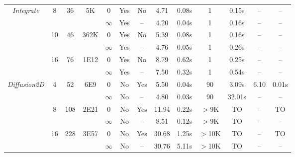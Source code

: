 \begin{savenotes}
\begin{table*}[t]
\begin{center}
\begin{threeparttable}
\begin{tabular}{|c|c|c|c|c|c|c||c|c||c|c||c|c|}
	   \multirow{6}{*}{\textit{Integrate}} & \multirow{2}{*}{8} & \multirow{2}{*}{36} &  \multirow{2}{*}{5K} 
          												     & 0 & Yes & No & 4.71 & 0.08s & 1 & 0.15s & --  & -- \tnote{a}\\ \cline{5-13}
          						       &                            & &  &  $\infty$ & Yes & -- & 4.20 & 0.04s & 1 & 0.16s &  -- & --\\ \cline{2-13}
						       		& \multirow{2}{*}{10} & \multirow{2}{*}{46} &  \multirow{2}{*}{362K} 
          												     & 0 & Yes & No & 5.39 & 0.08s & 1 & 0.16s & -- & -- \tnote{a}\\ \cline{5-13}
          						       &                            & &  &  $\infty$ & Yes & -- & 4.76 & 0.05s & 1 & 0.26s &  -- & --\\ \cline{2-13}
						              & \multirow{2}{*}{16} & \multirow{2}{*}{76} &  \multirow{2}{*}{1E12} 
          												     & 0 & Yes & No & 8.79 & 0.62s & 1 & 0.25s & -- & -- \tnote{a}\\ \cline{5-13}
          						       &                            & &  &  $\infty$ & Yes & -- & 7.50 & 0.32s & 1 & 0.54s & --  & --\\ \hline
						       \hline
						       
	    \multirow{6}{*}{\textit{Diffusion2D}} & \multirow{2}{*}{4} & \multirow{2}{*}{52} &  \multirow{2}{*}{6E9} 
          												     & 0 & No & Yes & 5.50 & 0.04s & 90 & 3.09s & 6.10 & 0.01s\\ \cline{5-13}
          						       &                            & &  &  $\infty$ & No & -- & 4.80 & 0.03s & 90 & 32.01s &  -- & --\\ \cline{2-13}
						       		& \multirow{2}{*}{8} & \multirow{2}{*}{108} &  \multirow{2}{*}{2E21} 
          												     & 0 & No & Yes & 11.94 & 0.22s & $>$9K & TO & -- & TO\\ \cline{5-13}
          						       &                            & &  &  $\infty$ & No & -- & 8.51 & 0.12s & $>$9K & TO &  -- & --\\ \cline{2-13}
						              & \multirow{2}{*}{16} & \multirow{2}{*}{228} &  \multirow{2}{*}{3E57} 
          												     & 0 & No & Yes & 30.68 & 1.25s & $>$10K & TO & -- & TO\\ \cline{5-13}
          						       &                            & &  &  $\infty$ & No & -- & 30.76 & 5.11s & $>$10K & TO & --  & --\\ \hline
						       \hline
						       

\end{tabular}
\end{threeparttable}
\end{center}
\end{table*}
\end{savenotes}
